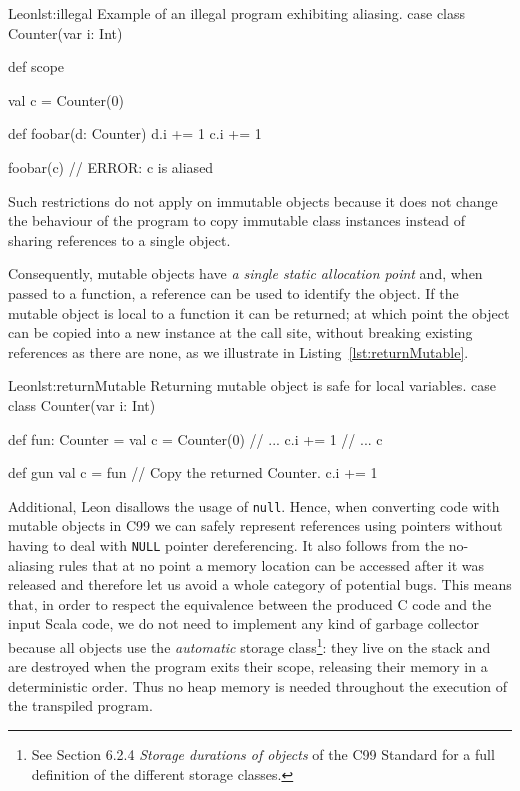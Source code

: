 \documentclass[a4paper,twoside]{article}
\newcommand{\InlineC}[1]{\lstinline[language=C99]|#1|}
\newcommand{\InlineS}[1]{\lstinline[language=Leon]|#1|}
\newcommand{\RefCode}[1]{Listing~\ref{#1}}
\begin{document}
\begin{Code}{Leon}{lst:illegal}{%
Example of an illegal program exhibiting aliasing.}
case class Counter(var i: Int)

def scope {
  val c = Counter(0)

  def foobar(d: Counter) {
    d.i += 1
    c.i += 1
  }

  foobar(c) // ERROR: c is aliased
}
\end{Code}

Such restrictions do not apply on immutable objects because it does not change
the behaviour of the program to copy immutable class instances instead of
sharing references to a single object.

Consequently, mutable objects have \emph{a single static allocation point} and,
when passed to a function, a reference can be used to identify the object. If
the mutable object is local to a function it can be returned; at which point the
object can be copied into a new instance at the call site, without breaking
existing references as there are none, as we illustrate in
\RefCode{lst:returnMutable}.

\begin{Code}{Leon}{lst:returnMutable}{%
Returning mutable object is safe for local variables.}
case class Counter(var i: Int)

def fun: Counter = {
  val c = Counter(0)
  // ...
  c.i += 1
  // ...
  c
}

def gun {
  val c = fun // Copy the returned Counter.
  c.i += 1
}
\end{Code}

Additional, Leon disallows the usage of \InlineS{null}. Hence, when converting
code with mutable objects in C99 we can safely represent references using
pointers without having to deal with \InlineC{NULL} pointer dereferencing. It
also follows from the no-aliasing rules that at no point a memory location can
be accessed after it was released and therefore let us avoid a whole category of
potential bugs. This means that, in order to respect the equivalence between the
produced C code and the input Scala code, we do not need to implement any kind
of garbage collector because all objects use the \emph{automatic} storage
class\footnote{See Section 6.2.4 \emph{Storage durations of objects} of the C99
Standard for a full definition of the different storage classes.}: they live on
the stack and are destroyed when the program exits their scope, releasing their
memory in a deterministic order. Thus no heap memory is needed throughout the
execution of the transpiled program.
\end{document}
